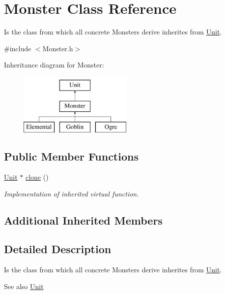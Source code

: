 \hypertarget{class_monster}{}\section{Monster Class Reference}
\label{class_monster}


Is the class from which all concrete Monsters derive inherites from \hyperlink{class_unit}{Unit}.  




{\ttfamily \#include $<$Monster.\+h$>$}

Inheritance diagram for Monster\+:\begin{figure}[H]
\begin{center}
\leavevmode
\includegraphics[height=3.000000cm]{class_monster}
\end{center}
\end{figure}
\subsection*{Public Member Functions}
\begin{DoxyCompactItemize}
\item 
\hyperlink{class_unit}{Unit} $\ast$ \hyperlink{class_monster_a1ee9cabba47d15d4e196d19561250ee0}{clone} ()
\begin{DoxyCompactList}\small\item\em Implementation of inherited virtual function. \end{DoxyCompactList}\end{DoxyCompactItemize}
\subsection*{Additional Inherited Members}


\subsection{Detailed Description}
Is the class from which all concrete Monsters derive inherites from \hyperlink{class_unit}{Unit}. 

\begin{DoxySeeAlso}{See also}
\hyperlink{class_unit}{Unit} 
\end{DoxySeeAlso}


